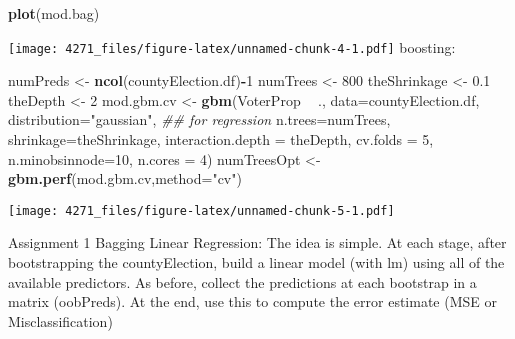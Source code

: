 \documentclass[]{article}
\newenvironment{Shaded}{\begin{snugshade}}{\end{snugshade}}
\newcommand{\CommentTok}[1]{\textcolor[rgb]{0.56,0.35,0.01}{\textit{#1}}}
\newcommand{\DataTypeTok}[1]{\textcolor[rgb]{0.13,0.29,0.53}{#1}}
\newcommand{\DecValTok}[1]{\textcolor[rgb]{0.00,0.00,0.81}{#1}}
\newcommand{\FloatTok}[1]{\textcolor[rgb]{0.00,0.00,0.81}{#1}}
\newcommand{\KeywordTok}[1]{\textcolor[rgb]{0.13,0.29,0.53}{\textbf{#1}}}
\newcommand{\NormalTok}[1]{#1}
\newcommand{\OperatorTok}[1]{\textcolor[rgb]{0.81,0.36,0.00}{\textbf{#1}}}
\newcommand{\StringTok}[1]{\textcolor[rgb]{0.31,0.60,0.02}{#1}}
\begin{document}
\begin{Shaded}
\begin{Highlighting}[]
\KeywordTok{plot}\NormalTok{(mod.bag)}
\end{Highlighting}
\end{Shaded}

\texttt{[image: 4271\_files/figure-latex/unnamed-chunk-4-1.pdf]}
boosting:

\begin{Shaded}
\begin{Highlighting}[]
\NormalTok{numPreds <-}\StringTok{ }\KeywordTok{ncol}\NormalTok{(countyElection.df)}\OperatorTok{-}\DecValTok{1}
\NormalTok{numTrees <-}\StringTok{ }\DecValTok{800}
\NormalTok{theShrinkage <-}\StringTok{ }\FloatTok{0.1}
\NormalTok{theDepth <-}\StringTok{ }\DecValTok{2}
\NormalTok{mod.gbm.cv <-}\StringTok{ }\KeywordTok{gbm}\NormalTok{(VoterProp }\OperatorTok{~}\StringTok{ }\NormalTok{.,}
                  \DataTypeTok{data=}\NormalTok{countyElection.df,}
                  \DataTypeTok{distribution=}\StringTok{"gaussian"}\NormalTok{, }\CommentTok{## for regression}
                  \DataTypeTok{n.trees=}\NormalTok{numTrees,}
                  \DataTypeTok{shrinkage=}\NormalTok{theShrinkage,}
                  \DataTypeTok{interaction.depth =}\NormalTok{ theDepth,}
                  \DataTypeTok{cv.folds =} \DecValTok{5}\NormalTok{,}
                  \DataTypeTok{n.minobsinnode=}\DecValTok{10}\NormalTok{,}
                  \DataTypeTok{n.cores =} \DecValTok{4}\NormalTok{)}
\NormalTok{numTreesOpt <-}\StringTok{ }\KeywordTok{gbm.perf}\NormalTok{(mod.gbm.cv,}\DataTypeTok{method=}\StringTok{"cv"}\NormalTok{)}
\end{Highlighting}
\end{Shaded}

\texttt{[image: 4271\_files/figure-latex/unnamed-chunk-5-1.pdf]}

Assignment 1 Bagging Linear Regression: The idea is simple. At each
stage, after bootstrapping the countyElection, build a linear model
(with lm) using all of the available predictors. As before, collect the
predictions at each bootstrap in a matrix (oobPreds). At the end, use
this to compute the error estimate (MSE or Misclassification)
\end{document}
